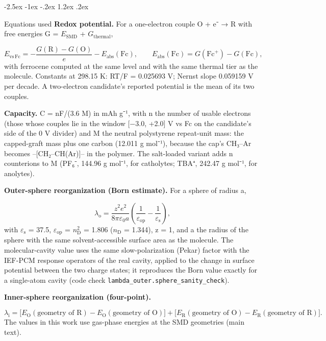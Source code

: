 \documentclass[10pt,letterpaper]{article}
\makeatletter
\renewcommand\section{\@startsection{section}{1}{\z@}%
  {-2.5ex \@plus -1ex \@minus -.2ex}%
  {1.2ex \@plus .2ex}%
  {\normalfont\large\bfseries\raggedright}}
\makeatother
\begin{document}
\section{Equations used}
\textbf{Redox potential.} For a one-electron couple O + e⁻ → R with free energies G = $E_{\mathrm{SMD}}$ + $G_{\mathrm{thermal}}$,

\[
  E_{\mathrm{vs\,Fc}} = -\frac{G(\mathrm{R}) - G(\mathrm{O})}{e} - E_{\mathrm{abs}}(\mathrm{Fc}),\qquad E_{\mathrm{abs}}(\mathrm{Fc}) = G(\mathrm{Fc}^{+}) - G(\mathrm{Fc}),
\]
with ferrocene computed at the same level and with the same thermal tier as the molecule. Constants at 298.15 K: RT/F = 0.025693 V; Nernst slope 0.059159 V per decade. A two-electron candidate's reported potential is the mean of its two couples.

\textbf{Capacity.} C = nF/(3.6 M) in mAh g⁻¹, with n the number of usable electrons (those whose couples lie in the window [−3.0, +2.0] V vs Fc on the candidate's side of the 0 V divider) and M the neutral polystyrene repeat-unit mass: the capped-graft mass plus one carbon (12.011 g mol⁻¹), because the cap's CH₃–Ar becomes –[CH₂–CH(Ar)]– in the polymer. The salt-loaded variant adds n counterions to M (PF₆⁻, 144.96 g mol⁻¹, for catholytes; TBA⁺, 242.47 g mol⁻¹, for anolytes).

\textbf{Outer-sphere reorganization (Born estimate).} For a sphere of radius a,

\[
  \lambda_{\mathrm{o}} = \frac{z^{2} e^{2}}{8\pi\varepsilon_{0} a}\left(\frac{1}{\varepsilon_{\mathrm{op}}} - \frac{1}{\varepsilon_{\mathrm{s}}}\right),
\]
with $\varepsilon_{\mathrm{s}}$ = 37.5, $\varepsilon_{\mathrm{op}}$ = $n_{\mathrm{D}}^{2}$ = 1.806 ($n_{\mathrm{D}}$ = 1.344), z = 1, and a the radius of the sphere with the same solvent-accessible surface area as the molecule. The molecular-cavity value uses the same slow-polarization (Pekar) factor with the IEF-PCM response operators of the real cavity, applied to the change in surface potential between the two charge states; it reproduces the Born value exactly for a single-atom cavity (code check \texttt{lambda\_\allowbreak{}outer.\allowbreak{}sphere\_\allowbreak{}sanity\_\allowbreak{}check}).

\textbf{Inner-sphere reorganization (four-point).}

\[
  \lambda_{\mathrm{i}} = \bigl[E_{\mathrm{O}}(\text{geometry of R}) - E_{\mathrm{O}}(\text{geometry of O})\bigr] + \bigl[E_{\mathrm{R}}(\text{geometry of O}) - E_{\mathrm{R}}(\text{geometry of R})\bigr].
\]
The values in this work use gas-phase energies at the SMD geometries (main text).
\end{document}
